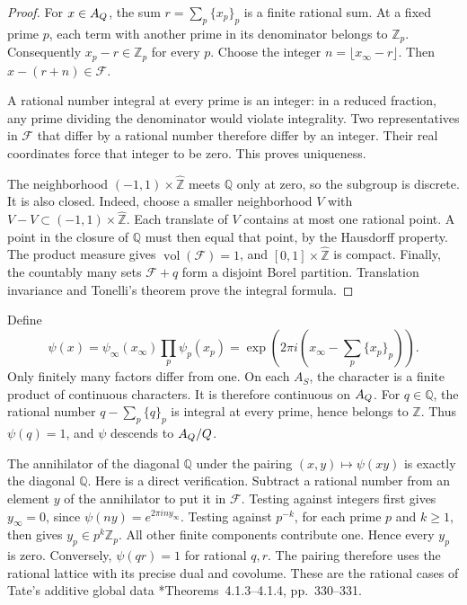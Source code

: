 \begin{proof}
For \(x\in A_{Q}\), the sum \(r=\sum_p\{x_p\}_p\) is a finite rational
sum. At a fixed prime \(p\), each term with another prime in its denominator
belongs to \(\mathbb Z_p\). Consequently \(x_p-r\in\mathbb Z_p\) for every \(p\).
Choose the integer \(n=\lfloor x_\infty-r\rfloor\). Then
\(x-(r+n)\in\mathcal F\).

A rational number integral at every prime is an integer: in a reduced
fraction, any prime dividing the denominator would violate integrality.
Two representatives in \(\mathcal F\) that differ by a rational number
therefore differ by an integer. Their real coordinates force that integer
to be zero. This proves uniqueness.

The neighborhood \((-1,1)\times\widehat{\mathbb Z}\) meets \(\mathbb Q\) only at zero,
so the subgroup is discrete. It is also closed. Indeed, choose a smaller
neighborhood \(V\) with \(V-V\subset(-1,1)\times\widehat{\mathbb Z}\).
Each translate of \(V\) contains at most one rational point. A point in
the closure of \(\mathbb Q\) must then equal that point, by the Hausdorff
property. The product measure gives \(\operatorname{vol}(\mathcal F)=1\),
and \([0,1]\times\widehat{\mathbb Z}\) is compact. Finally, the countably many sets
\(\mathcal F+q\) form a disjoint Borel partition. Translation invariance
and Tonelli's theorem prove the integral formula.
\end{proof}

Define
\begin{equation}
 \psi(x)=\psi_\infty(x_\infty)\prod_p\psi_p(x_p)
 =\exp\!\left(2\pi i\left(x_\infty-\sum_p\{x_p\}_p\right)\right).
 \label{eq:adeles-character}
\end{equation}
Only finitely many factors differ from one. On each \(A_S\), the character
is a finite product of continuous characters. It is therefore continuous
on \(A_{Q}\). For \(q\in\mathbb Q\), the rational number
\(q-\sum_p\{q\}_p\) is integral at every prime, hence belongs to
\(\mathbb Z\). Thus \(\psi(q)=1\), and \(\psi\) descends to
\(A_{Q}/Q\).

The annihilator of the diagonal \(\mathbb Q\) under the pairing
\((x,y)\mapsto\psi(xy)\) is exactly the diagonal \(\mathbb Q\).
Here is a direct verification. Subtract a rational number from an element
\(y\) of the annihilator to put it in \(\mathcal F\).
Testing against integers first gives \(y_\infty=0\), since
\(\psi(ny)=e^{2\pi iny_\infty}\). Testing against \(p^{-k}\), for each
prime \(p\) and \(k\geq1\), then gives \(y_p\in p^k\mathbb Z_p\).
All other finite components contribute one. Hence every \(y_p\) is zero.
Conversely, \(\psi(qr)=1\) for rational \(q,r\).
The pairing therefore uses the rational lattice with its precise dual and
covolume. These are the rational cases of Tate's additive global data
\cite{Tate1950}*{Theorems~4.1.3--4.1.4, pp.~330--331}.

